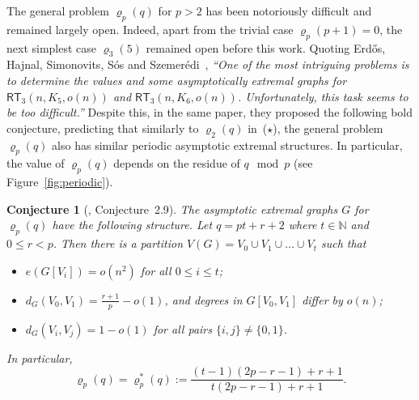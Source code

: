 \documentclass[11pt, a4paper]{article}
\def\pseudop{{\star}}
\newtheorem{conjx}{Conjecture}
\theoremstyle{definition}
\newcommand{\rt}{{\mathsf{RT}}}
\begin{document}
The general problem $\varrho_p(q)$ for $p>2$ has been notoriously difficult and remained largely open. Indeed, apart from the trivial case $\varrho_p(p+1)=0$, the next simplest case $\varrho_3(5)$ remained open before this work. Quoting Erd\H{o}s, Hajnal, Simonovits, S\'os and Szemer\'edi~\cite{EHSSSz}, \emph{``One of the most intriguing problems is to determine the values and some asymptotically extremal graphs for $\rt_3(n,K_5,o(n))$ and $\rt_3(n,K_6,o(n))$. Unfortunately, this task seems to be too difficult.''} Despite this, in the same paper, they proposed the following bold conjecture, predicting that similarly to $\varrho_2(q)$ in~($\pseudop$), the general problem $\varrho_p(q)$ also has similar periodic asymptotic extremal structures. In particular, the value of $\varrho_p(q)$ depends on the residue of $q\!\mod p$ (see Figure~\ref{fig:periodic}).%

\begin{conjx}[\cite{EHSSSz}, Conjecture~2.9]\label{conj}
	The asymptotic extremal graphs $G$ for $\varrho_p(q)$ have the following structure.
	Let $q=pt+r+2$ where $t\in\mathbb{N}$ and $0 \leq r < p$. Then there is a partition $V(G)= V_0\cup V_1 \cup \ldots \cup V_t$ such that
	\begin{itemize}
		\item $e(G[V_i])=o(n^2)$ for all $0\le i \le t$;
		
		\item $d_G(V_0,V_1) = \frac{r+1}{p}-o(1)$, and degrees in $G[V_0,V_1]$ differ by $o(n)$;
		
		\item $d_G(V_i,V_j) =1-o(1)$ for all pairs $\lbrace i,j\rbrace \neq \lbrace 0,1\rbrace$.
	\end{itemize}
	In particular, 
	\begin{equation}\label{eq:conjRTdensity}
		\varrho_p(q)=\varrho_p^*(q):=\frac{(t-1)(2p-r-1)+r+1}{t(2p-r-1)+r+1}.
	\end{equation}
\end{conjx}
\end{document}
